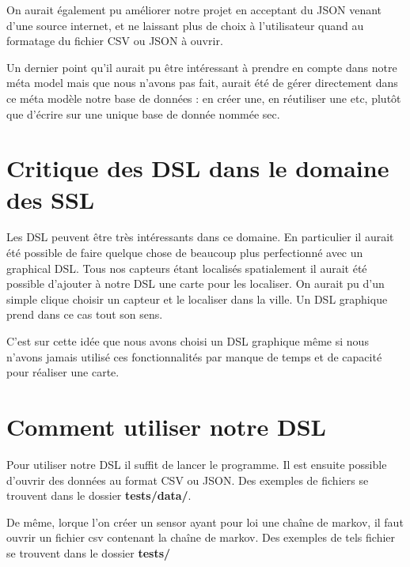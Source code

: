 \documentclass[11pt]{article}
\begin{document}
On aurait également pu améliorer notre projet en acceptant du JSON venant d'une source internet, et ne laissant plus de choix à l'utilisateur quand au formatage du fichier CSV ou JSON à ouvrir. 

Un dernier point qu'il aurait pu être intéressant à prendre en compte dans notre méta model mais que nous n'avons pas fait, aurait été de gérer directement dans ce méta modèle notre base de données : en créer une, en réutiliser une etc, plutôt que d'écrire sur une unique base de donnée nommée sec.


\section{Critique des DSL dans le domaine des SSL}

Les DSL peuvent être très intéressants dans ce domaine. En particulier il aurait été possible de faire quelque chose de beaucoup plus perfectionné avec un graphical DSL. Tous nos capteurs étant localisés spatialement il aurait été possible d'ajouter à notre DSL une carte pour les localiser. On aurait pu d'un simple clique choisir un capteur et le localiser dans la ville. Un DSL graphique prend dans ce cas tout son sens.

C'est sur cette idée que nous avons choisi un DSL graphique même si nous n'avons jamais utilisé ces fonctionnalités par manque de temps et de capacité pour réaliser une carte.

\newpage

\section*{Comment utiliser notre DSL}

Pour utiliser notre DSL il suffit de lancer le programme. Il est ensuite possible d'ouvrir des données au format CSV ou JSON. Des exemples de fichiers se trouvent dans le dossier \textbf{tests/data/}.

De même, lorque l'on créer un sensor ayant pour loi une chaîne de markov, il faut ouvrir un fichier csv contenant la chaîne de markov. Des exemples de tels fichier se trouvent dans le dossier \textbf{tests/}
\end{document}
